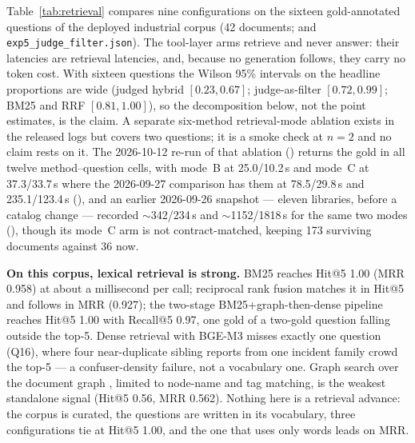 Table~\ref{tab:retrieval} compares nine configurations on the sixteen
gold-annotated questions of the deployed industrial corpus (42 documents;
 and
\texttt{exp5\_judge\_filter.json}). The tool-layer arms retrieve and never
answer: their latencies are retrieval latencies, and, because no generation
follows, they carry no token cost. With sixteen questions the Wilson 95\%
intervals on the headline proportions are wide (judged hybrid $[0.23, 0.67]$;
judge-as-filter $[0.72, 0.99]$; BM25 and RRF $[0.81, 1.00]$), so the
decomposition below, not the point estimates, is the claim. A separate
six-method retrieval-mode ablation exists in the released logs but covers two
questions; it is a smoke check at $n = 2$ and no claim rests on it. The
2026-10-12 re-run of that ablation
()
returns the gold in all twelve method--question cells, with mode~B at
25.0/10.2\,s and mode~C at 37.3/33.7\,s where the 2026-09-27 comparison has
them at 78.5/29.8\,s and 235.1/123.4\,s
(),
and an earlier 2026-09-26 snapshot --- eleven libraries, before a catalog
change --- recorded $\sim$342/234\,s and $\sim$1152/1818\,s for the same two
modes
(),
though its mode~C arm is not contract-matched, keeping 173 surviving documents
against 36 now.

\textbf{On this corpus, lexical retrieval is strong.} BM25 \cite{bm25}
reaches Hit@5 1.00 (MRR 0.958) at about a millisecond per call; reciprocal
rank fusion \cite{rrf-cormack} matches it in Hit@5 and follows in MRR (0.927);
the two-stage BM25+graph-then-dense pipeline reaches Hit@5 1.00 with
Recall@5 0.97, one gold of a two-gold question falling outside the top-5.
Dense retrieval with BGE-M3 \cite{bge-m3} misses exactly one question (Q16),
where four near-duplicate sibling reports from one incident family crowd the
top-5 --- a confuser-density failure, not a vocabulary one. Graph search over
the document graph \cite{graphrag}, limited to node-name and tag matching, is
the weakest standalone signal (Hit@5 0.56, MRR 0.562). Nothing here is a
retrieval advance: the corpus is curated, the questions are written in its
vocabulary, three configurations tie at Hit@5 1.00, and the one that uses only
words leads on MRR.

